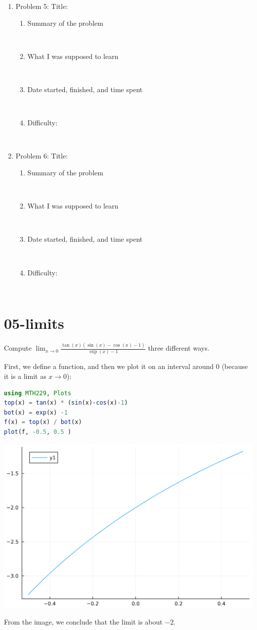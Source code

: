 \documentclass[12pt,answers]{book}
\newcommand{\eb}{\begin{tcolorbox}[width=0.90\textwidth, height=4cm, colback=white]
    ~
  \end{tcolorbox}}
\newcommand{\ebb}{\begin{tcolorbox}[width=0.90\textwidth, height=9cm, colback=white]
    ~
  \end{tcolorbox}}
\newcommand{\ebbb}{\begin{tcolorbox}[width=0.90\textwidth, height=2cm, colback=white]
    ~
    \end{tcolorbox}}
\newcommand{\ebbbb}{\begin{tcolorbox}[width=0.90\textwidth, height=1cm, colback=white]
    ~
    \end{tcolorbox}}
\begin{document}
\begin{enumerate}
  \item Problem 5: \hspace{2cm} Title: \underline{\hspace{8cm}}
  \begin{enumerate}
    \item Summary of the problem \eb
    \item What I was supposed to learn \ebb
    \item Date started, finished, and time spent \ebbb
    \item Difficulty: \ebbbb
  \end{enumerate}
  \clearpage
  \item Problem 6: \hspace{2cm} Title: \underline{\hspace{8cm}}
  \begin{enumerate}
    \item Summary of the problem \eb
    \item What I was supposed to learn \ebb
    \item Date started, finished, and time spent \ebbb
    \item Difficulty: \ebbbb
  \end{enumerate}
\end{enumerate}

\clearpage

\chapter{05-limits}
Compute $\displaystyle \lim_{x\to 0} \frac{\tan (x) (\sin (x)-\cos (x)-1)}{\exp (x)-1}$ three different ways.

\vspace{5mm}
First, we define a function, and then we plot it on an interval around 0 (because it is a limit as $x\to0$):\newline
\begin{minipage}{0.49\textwidth}
\begin{lstlisting}[language=Julia]
using MTH229, Plots
top(x) = tan(x) * (sin(x)-cos(x)-1)
bot(x) = exp(x) -1
f(x) = top(x) / bot(x)
plot(f, -0.5, 0.5 )
\end{lstlisting}
\end{minipage}
\begin{minipage}{0.49\textwidth}
\includegraphics[width=0.7\linewidth]{SkeletonNotes/05-graphics-1}
\end{minipage}\newline
From the image, we conclude that the limit is about $-2$.
\end{document}
